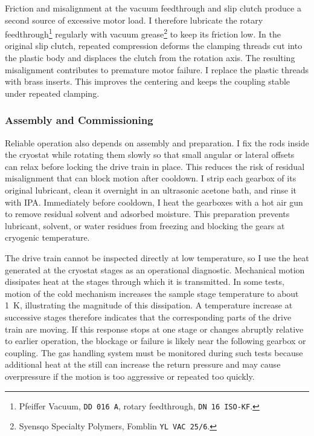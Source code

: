             Friction and misalignment at the vacuum feedthrough and slip clutch produce a second source of excessive motor load. I therefore lubricate the rotary feedthrough\footnote{Pfeiffer Vacuum, \texttt{DD 016 A}, rotary feedthrough, \texttt{DN 16 ISO-KF}.} regularly with vacuum grease\footnote{Syensqo Specialty Polymers, Fomblin \texttt{YL VAC 25/6}.} to keep its friction low. In the original slip clutch, repeated compression deforms the clamping threads cut into the plastic body and displaces the clutch from the rotation axis. The resulting misalignment contributes to premature motor failure. I replace the plastic threads with brass inserts. This improves the centering and keeps the coupling stable under repeated clamping.

        \subsubsection*{Assembly and Commissioning}

            Reliable operation also depends on assembly and preparation. I fix the rods inside the cryostat while rotating them slowly so that small angular or lateral offsets can relax before locking the drive train in place. This reduces the risk of residual misalignment that can block motion after cooldown. I strip each gearbox of its original lubricant, clean it overnight in an ultrasonic acetone bath, and rinse it with IPA. Immediately before cooldown, I heat the gearboxes with a hot air gun to remove residual solvent and adsorbed moisture. This preparation prevents lubricant, solvent, or water residues from freezing and blocking the gears at cryogenic temperature.

            The drive train cannot be inspected directly at low temperature, so I use the heat generated at the cryostat stages as an operational diagnostic. Mechanical motion dissipates heat at the stages through which it is transmitted. In some tests, motion of the cold mechanism increases the sample stage temperature to about \qty{1}{\kelvin}, illustrating the magnitude of this dissipation. A temperature increase at successive stages therefore indicates that the corresponding parts of the drive train are moving. If this response stops at one stage or changes abruptly relative to earlier operation, the blockage or failure is likely near the following gearbox or coupling. The gas handling system must be monitored during such tests because additional heat at the still can increase the return pressure and may cause overpressure if the motion is too aggressive or repeated too quickly.

